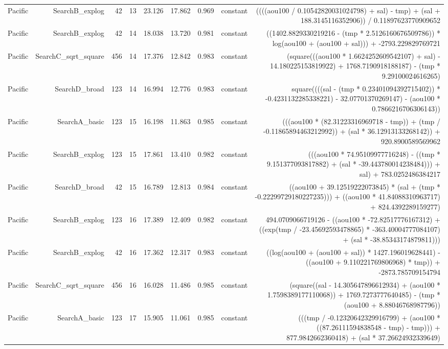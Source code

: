 \begin{table}
{\begin{tabular}{lrrrrrrrr}
Pacific & SearchB\_explog & 42 & 13 & 23.126 & 17.862 & 0.969 & constant & ((((aou100 / 0.10542820031024798) + sal) - tmp) + (sal + 188.3145116352906)) / 0.11897623770909652 \\
Pacific & SearchB\_explog & 42 & 14 & 18.038 & 13.720 & 0.981 & constant & ((1402.8829330219216 - (tmp * 2.5126160676509786)) * log(aou100 + (aou100 + sal))) + -2793.229829769721 \\
Pacific & SearchC\_sqrt\_square & 456 & 14 & 17.376 & 12.842 & 0.983 & constant & (square(((aou100 * 1.6624252609542107) + sal) - 14.180225153819922) + 1768.7190918188187) - (tmp * 9.29100024616265) \\
Pacific & SearchD\_broad & 123 & 14 & 16.994 & 12.776 & 0.983 & constant & square((((sal - (tmp * 0.23401094392715402)) * -0.4231132285338221) - 32.07701370269147) - (aou100 * 0.7866216706306143)) \\
Pacific & SearchA\_basic & 123 & 15 & 16.198 & 11.863 & 0.985 & constant & (((aou100 * (82.31223316969718 - tmp)) + (tmp / -0.11865894463212992)) + (sal * 36.12913133268142)) + 920.8900589569962 \\
Pacific & SearchB\_explog & 123 & 15 & 17.861 & 13.410 & 0.982 & constant & (((aou100 * 74.95109977716248) - ((tmp * 9.151377093817882) + (sal * -39.443780014238484))) + sal) + 783.0252486384217 \\
Pacific & SearchD\_broad & 42 & 15 & 16.789 & 12.813 & 0.984 & constant & ((aou100 + 39.12519222073845) * (sal + (tmp * -0.22299729180227235))) + ((aou100 * 41.84088310963717) + 824.4392289159277) \\
Pacific & SearchB\_explog & 123 & 16 & 17.389 & 12.409 & 0.982 & constant & 494.0709066719126 - ((aou100 * -72.82517776167312) + ((exp(tmp / -23.45692593478865) * -363.40004777084107) + (sal * -38.85343174879811))) \\
Pacific & SearchB\_explog & 42 & 16 & 17.362 & 12.317 & 0.983 & constant & ((log(aou100 + (aou100 + sal)) * 1427.196019628441) - ((aou100 + 9.110221769806968) * tmp)) + -2873.785709154794 \\
Pacific & SearchC\_sqrt\_square & 456 & 16 & 16.028 & 11.486 & 0.985 & constant & (square((sal - 14.305647896612934) + (aou100 * 1.7598389177110068)) + 1769.7273777640485) - (tmp * (aou100 + 8.88046768987796)) \\
Pacific & SearchA\_basic & 123 & 17 & 15.905 & 11.061 & 0.985 & constant & (((tmp / -0.12320642329916799) + (aou100 * ((87.26111594838548 - tmp) - tmp))) + 877.9842662360418) + (sal * 37.26624932339649) \\

\end{tabular}}
\end{table}
